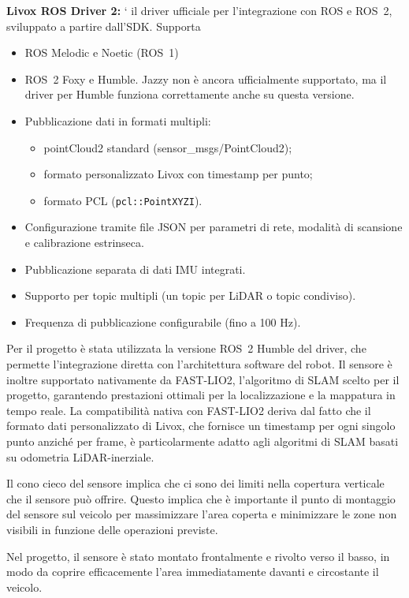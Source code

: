 \textbf{Livox ROS Driver 2:} ` il driver ufficiale per l'integrazione con ROS e ROS~2, sviluppato a partire dall'SDK. Supporta
\begin{itemize}
    \item ROS Melodic e Noetic (ROS~1)
    \item ROS~2 Foxy e Humble. Jazzy non è ancora ufficialmente supportato, ma il driver per Humble funziona correttamente anche su questa versione.
    \item Pubblicazione dati in formati multipli:
          \begin{itemize}
              \item pointCloud2 standard (sensor\_msgs/PointCloud2);
              \item formato personalizzato Livox con timestamp per punto;
              \item formato PCL (\texttt{pcl::PointXYZI}).
          \end{itemize}
    \item Configurazione tramite file JSON per parametri di rete, modalità di scansione e calibrazione estrinseca.
    \item Pubblicazione separata di dati IMU integrati.
    \item Supporto per topic multipli (un topic per LiDAR o topic condiviso).
    \item Frequenza di pubblicazione configurabile (fino a 100 Hz).
\end{itemize}

Per il progetto è stata utilizzata la versione ROS~2 Humble del driver, che permette l'integrazione diretta con l'architettura software del robot. Il sensore è inoltre supportato nativamente da FAST-LIO2, l'algoritmo di SLAM scelto per il progetto, garantendo prestazioni ottimali per la localizzazione e la mappatura in tempo reale. La compatibilità nativa con FAST-LIO2 deriva dal fatto che il formato dati personalizzato di Livox, che fornisce un timestamp per ogni singolo punto anziché per frame, è particolarmente adatto agli algoritmi di SLAM basati su odometria LiDAR-inerziale.

\begin{note}
    Il cono cieco del sensore implica che ci sono dei limiti nella copertura verticale che il sensore può offrire. Questo implica che è importante il punto di montaggio del sensore sul veicolo per massimizzare l'area coperta e minimizzare le zone non visibili in funzione delle operazioni previste.

    Nel progetto, il sensore è stato montato frontalmente e rivolto verso il basso, in modo da coprire efficacemente l'area immediatamente davanti e circostante il veicolo.
\end{note}

